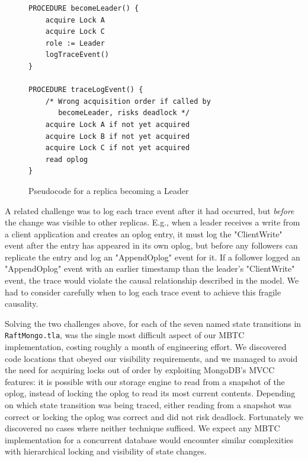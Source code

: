 \documentclass{vldb}
\begin{document}
\begin{figure}
\begin{verbatim}
PROCEDURE becomeLeader() {
    acquire Lock A
    acquire Lock C
    role := Leader
    logTraceEvent()
}

PROCEDURE traceLogEvent() {
    /* Wrong acquisition order if called by
       becomeLeader, risks deadlock */
    acquire Lock A if not yet acquired
    acquire Lock B if not yet acquired
    acquire Lock C if not yet acquired
    read oplog
}
\end{verbatim}
\caption{Pseudocode for a replica becoming a Leader}
\label{fig:traceLogEvent}
\end{figure}

A related challenge was to log each trace event after it had occurred, but \textit{before} the change was visible to other replicas. 
E.g., when a leader receives a write from a client application and creates an oplog entry, it must log the "ClientWrite" event after the entry has appeared in its own oplog, but before any followers can replicate the entry and log an "AppendOplog" event for it. 
If a follower logged an "AppendOplog" event with an earlier timestamp than the leader's "ClientWrite" event, the trace would violate the causal relationship described in the model. 
We had to consider carefully when to log each trace event to achieve this fragile causality.

Solving the two challenges above, for each of the seven named state transitions in \texttt{RaftMongo.tla}, was the single most difficult aspect of our MBTC implementation, costing roughly a month of engineering effort. 
We discovered code locations that obeyed our visibility requirements, and we managed to avoid the need for acquiring locks out of order by exploiting MongoDB's MVCC features: it is possible with our storage engine to read from a snapshot of the oplog, instead of locking the oplog to read its most current contents.
Depending on which state transition was being traced, either reading from a snapshot was correct or locking the oplog was correct and did not risk deadlock.
Fortunately we discovered no cases where neither technique sufficed.
We expect any MBTC implementation for a concurrent database would encounter similar complexities with hierarchical locking and visibility of state changes.

\end{document}
